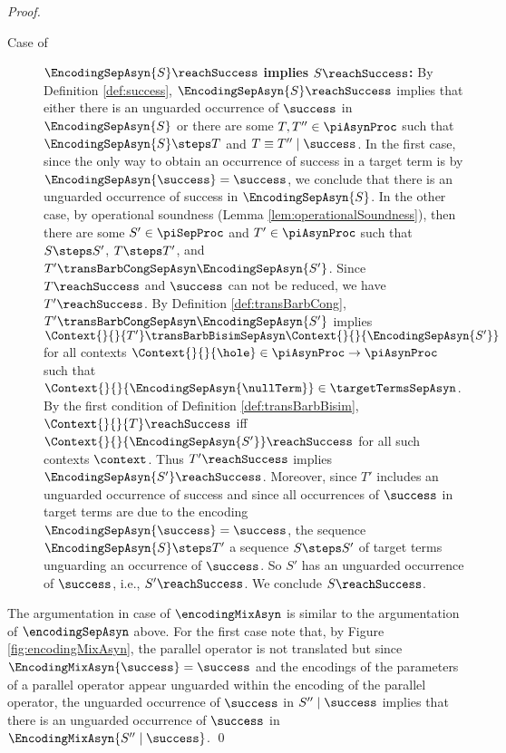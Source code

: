 \documentclass[]{llncs}
\begin{document}
\begin{proof}
\begin{description}
		\item[Case of] $ \EncodingSepAsyn{S}\reachSuccess $ \textbf{implies} $ S\reachSuccess $\textbf{:} By Definition \ref{def:success}, $ \EncodingSepAsyn{S}\reachSuccess $ implies that either there is an unguarded occurrence of $ \success $ in $ \EncodingSepAsyn{S} $ or there are some $ T, T'' \in \piAsynProc $ such that $ \EncodingSepAsyn{S} \steps T $ and $ T \equiv T'' \mid \success $. In the first case, since the only way to obtain an occurrence of success in a target term is by $ \EncodingSepAsyn{\success} = \success $, we conclude that there is an unguarded occurrence of success in $ \EncodingSepAsyn{S} $. In the other case, by operational soundness (Lemma \ref{lem:operationalSoundness}), then there are some $ S' \in \piSepProc $ and $ T' \in \piAsynProc $ such that $ S \steps S' $, $ T \steps T' $, and $ T' \transBarbCongSepAsyn \EncodingSepAsyn{S'} $. Since $ T\reachSuccess $ and $ \success $ can not be reduced, we have $ T'\reachSuccess $. By Definition \ref{def:transBarbCong}, $ T' \transBarbCongSepAsyn \EncodingSepAsyn{S'} $ implies $ \Context{}{}{T'} \transBarbBisimSepAsyn \Context{}{}{\EncodingSepAsyn{S'}} $ for all contexts $ \Context{}{}{\hole} \in \piAsynProc \to \piAsynProc $ such that $ \Context{}{}{\EncodingSepAsyn{\nullTerm}} \in \targetTermsSepAsyn $. By the first condition of Definition \ref{def:transBarbBisim}, $ \Context{}{}{T}\reachSuccess $ iff $ \Context{}{}{\EncodingSepAsyn{S'}}\reachSuccess $ for all such contexts $ \context $. Thus $ T'\reachSuccess $ implies $ \EncodingSepAsyn{S'}\reachSuccess $. Moreover, since $ T' $ includes an unguarded occurrence of success and since all occurrences of $ \success $ in target terms are due to the encoding $ \EncodingSepAsyn{\success} = \success $, the sequence $ \EncodingSepAsyn{S} \steps T' $ \simulates a sequence $ S \steps S' $ of target terms unguarding an occurrence of $ \success $. So $ S' $ has an unguarded occurrence of $ \success $, i.e., $ S'\reachSuccess $. We conclude $ S\reachSuccess $.
	\end{description}
	The argumentation in case of $ \encodingMixAsyn $ is similar to the argumentation of $ \encodingSepAsyn $ above. For the first case note that, by Figure \ref{fig:encodingMixAsyn}, the parallel operator is not translated \cleanly but since $ \EncodingMixAsyn{\success} = \success $ and the encodings of the parameters of a parallel operator appear unguarded within the encoding of the parallel operator, the unguarded occurrence of $ \success $ in $ S'' \mid \success $ implies that there is an unguarded occurrence of $ \success $ in $ \EncodingMixAsyn{S'' \mid \success} $.
	\qed
\end{proof}
\end{document}
